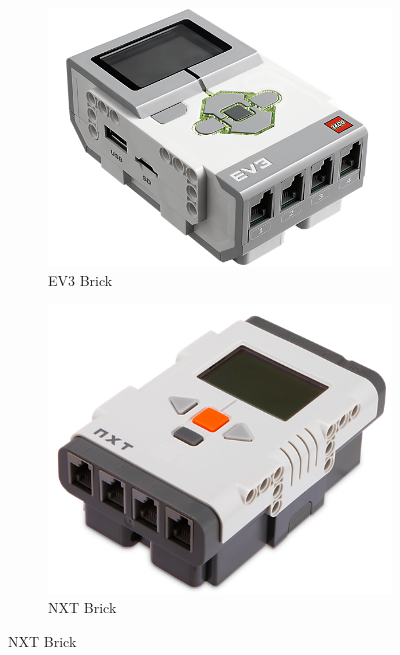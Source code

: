 \documentclass[11pt, a4paper, oneside]{article}
\begin{document}
		\begin{figure}[h!]
		\begin{subfigure}{.45\textwidth}
		  \centering
		  \includegraphics[scale=0.23]{img/EV3Brick.png}
		  \caption{EV3 Brick}
		\end{subfigure}%
		\begin{subfigure}{.45\textwidth}
		  \centering
		  \includegraphics[scale=0.35]{img/NXTBrick.png}
		  \caption{NXT Brick}
		\end{subfigure}
		\end{figure}
	
\end{document}

